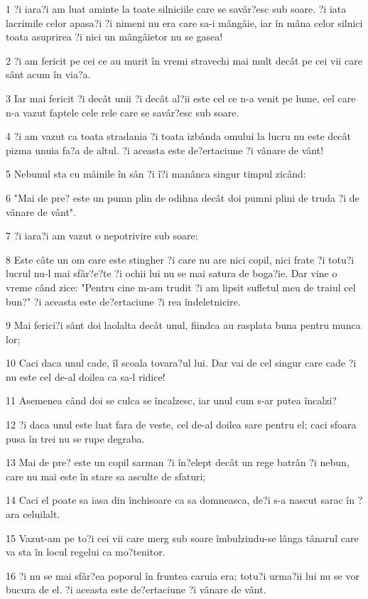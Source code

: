 \par 1 ?i iara?i am luat aminte la toate silniciile care se savâr?esc sub soare. ?i iata lacrimile celor apasa?i ?i nimeni nu era care sa-i mângâie, iar în mâna celor silnici toata asuprirea ?i nici un mângâietor nu se gasea!
\par 2 ?i am fericit pe cei ce au murit în vremi stravechi mai mult decât pe cei vii care sânt acum în via?a.
\par 3 Iar mai fericit ?i decât unii ?i decât al?ii este cel ce n-a venit pe lume, cel care n-a vazut faptele cele rele care se savâr?esc sub soare.
\par 4 ?i am vazut ca toata stradania ?i toata izbânda omului la lucru nu este decât pizma unuia fa?a de altul. ?i aceasta este de?ertaciune ?i vânare de vânt!
\par 5 Nebunul sta cu mâinile în sân ?i î?i manânca singur timpul zicând:
\par 6 "Mai de pre? este un pumn plin de odihna decât doi pumni plini de truda ?i de vânare de vânt".
\par 7 ?i iara?i am vazut o nepotrivire sub soare:
\par 8 Este câte un om care este stingher ?i care nu are nici copil, nici frate ?i totu?i lucrul nu-l mai sfâr?e?te ?i ochii lui nu se mai satura de boga?ie. Dar vine o vreme când zice: "Pentru cine m-am trudit ?i am lipsit sufletul meu de traiul cel bun?" ?i aceasta este de?ertaciune ?i rea îndeletnicire.
\par 9 Mai ferici?i sânt doi laolalta decât unul, fiindca au rasplata buna pentru munca lor;
\par 10 Caci daca unul cade, îl scoala tovara?ul lui. Dar vai de cel singur care cade ?i nu este cel de-al doilea ca sa-l ridice!
\par 11 Asemenea când doi se culca se încalzesc, iar unul cum s-ar putea încalzi?
\par 12 ?i daca unul este luat fara de veste, cel de-al doilea sare pentru el; caci sfoara pusa în trei nu se rupe degraba.
\par 13 Mai de pre? este un copil sarman ?i în?elept decât un rege batrân ?i nebun, care nu mai este în stare sa asculte de sfaturi;
\par 14 Caci el poate sa iasa din închisoare ca sa domneasca, de?i s-a nascut sarac în ?ara celuilalt.
\par 15 Vazut-am pe to?i cei vii care merg sub soare îmbulzindu-se lânga tânarul care va sta în locul regelui ca mo?tenitor.
\par 16 ?i nu se mai sfâr?ea poporul în fruntea caruia era; totu?i urma?ii lui nu se vor bucura de el. ?i aceasta este de?ertaciune ?i vânare de vânt.

